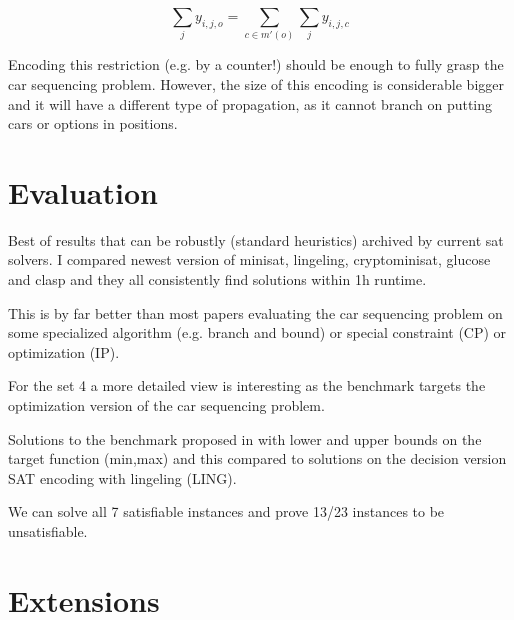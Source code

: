 \documentclass[]{llncs}
\newcommand{\TODO}[1]{ {\color{red}{#1} }}
\begin{document}
$$ \sum_{j} y_{i,j,o} = \sum_{c \in m'(o)} \sum_j y_{i,j,c} $$

Encoding this restriction (e.g. by a counter!) should be enough to fully
grasp the car sequencing problem. However, the size of this encoding
is considerable bigger  and it will have a different type of propagation, as
it cannot branch on putting cars or options in positions. 


\section{Evaluation}

Best of results that can be robustly (standard heuristics) archived by
current sat solvers. I compared newest version of minisat, lingeling,
cryptominisat, glucose and clasp and they all consistently find
solutions within 1h runtime. 

\DTLsetseparator{,}

\begin{table}[htbp]
    \caption{}
    \centering
\end{table}


This is by far better than most papers evaluating the car sequencing
problem on some specialized algorithm (e.g. branch and bound) or special
constraint (CP) or optimization (IP). 

For the set 4 a more detailed view is interesting as the benchmark
targets the optimization version of the car sequencing problem. 

\DTLsetseparator{,}

\begin{table}[htbp]
    \caption{Solutions to the benchmark proposed in \TODO{ref} with
    lower and upper bounds on the target function (min,max) and this
compared to solutions on the decision version  SAT encoding with lingeling (LING). }
    \centering
\end{table}


We can solve all 7 satisfiable instances and prove 13/23 instances to be
unsatisfiable. 


\section{Extensions}
\end{document}
